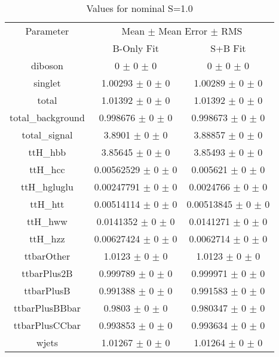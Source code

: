 \begin{table}
\centering
\caption{Values for nominal S=1.0}
\begin{tabular}{ccc}
\toprule
Parameter 	& \multicolumn{2}{c}{Mean $\pm$ Mean Error $\pm$ RMS}\\
 	& B-Only Fit & S+B Fit\\
\midrule
diboson 	& \num{0} $\pm$ \num{0} $\pm$ \num{0} 	& \num{0} $\pm$ \num{0} $\pm$ \num{0}\\
singlet 	& \num{1.00293} $\pm$ \num{0} $\pm$ \num{0} 	& \num{1.00289} $\pm$ \num{0} $\pm$ \num{0}\\
total 	& \num{1.01392} $\pm$ \num{0} $\pm$ \num{0} 	& \num{1.01392} $\pm$ \num{0} $\pm$ \num{0}\\
total\_background 	& \num{0.998676} $\pm$ \num{0} $\pm$ \num{0} 	& \num{0.998673} $\pm$ \num{0} $\pm$ \num{0}\\
total\_signal 	& \num{3.8901} $\pm$ \num{0} $\pm$ \num{0} 	& \num{3.88857} $\pm$ \num{0} $\pm$ \num{0}\\
ttH\_hbb 	& \num{3.85645} $\pm$ \num{0} $\pm$ \num{0} 	& \num{3.85493} $\pm$ \num{0} $\pm$ \num{0}\\
ttH\_hcc 	& \num{0.00562529} $\pm$ \num{0} $\pm$ \num{0} 	& \num{0.005621} $\pm$ \num{0} $\pm$ \num{0}\\
ttH\_hgluglu 	& \num{0.00247791} $\pm$ \num{0} $\pm$ \num{0} 	& \num{0.0024766} $\pm$ \num{0} $\pm$ \num{0}\\
ttH\_htt 	& \num{0.00514114} $\pm$ \num{0} $\pm$ \num{0} 	& \num{0.00513845} $\pm$ \num{0} $\pm$ \num{0}\\
ttH\_hww 	& \num{0.0141352} $\pm$ \num{0} $\pm$ \num{0} 	& \num{0.0141271} $\pm$ \num{0} $\pm$ \num{0}\\
ttH\_hzz 	& \num{0.00627424} $\pm$ \num{0} $\pm$ \num{0} 	& \num{0.0062714} $\pm$ \num{0} $\pm$ \num{0}\\
ttbarOther 	& \num{1.0123} $\pm$ \num{0} $\pm$ \num{0} 	& \num{1.0123} $\pm$ \num{0} $\pm$ \num{0}\\
ttbarPlus2B 	& \num{0.999789} $\pm$ \num{0} $\pm$ \num{0} 	& \num{0.999971} $\pm$ \num{0} $\pm$ \num{0}\\
ttbarPlusB 	& \num{0.991388} $\pm$ \num{0} $\pm$ \num{0} 	& \num{0.991583} $\pm$ \num{0} $\pm$ \num{0}\\
ttbarPlusBBbar 	& \num{0.9803} $\pm$ \num{0} $\pm$ \num{0} 	& \num{0.980347} $\pm$ \num{0} $\pm$ \num{0}\\
ttbarPlusCCbar 	& \num{0.993853} $\pm$ \num{0} $\pm$ \num{0} 	& \num{0.993634} $\pm$ \num{0} $\pm$ \num{0}\\
wjets 	& \num{1.01267} $\pm$ \num{0} $\pm$ \num{0} 	& \num{1.01264} $\pm$ \num{0} $\pm$ \num{0}\\
\bottomrule
\end{tabular}
\end{table}